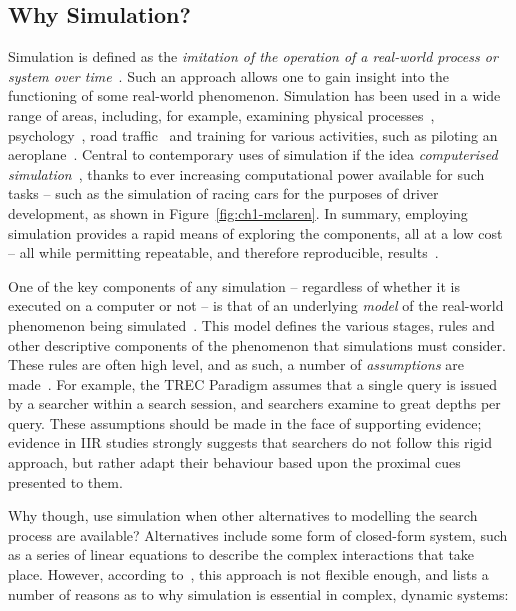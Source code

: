 \subsection{Why Simulation?}\label{sec:intro:simulation}
Simulation is defined as the \emph{imitation of the operation of a real-world process or system over time}~\citep{banks1996discrete}. Such an approach allows one to gain insight into the functioning of some real-world phenomenon. Simulation has been used in a wide range of areas, including, for example, examining physical processes~\citep{haessig1991physics_modelling}, psychology~\citep{hastie1988human_memory_simulation}, road traffic~\citep{mahmud2016traffic_modelling_electric} and training for various activities, such as piloting an aeroplane~\citep{sparko2010flight_simulators}. Central to contemporary uses of simulation if the idea \emph{computerised simulation}~\citep{heermann1990computer_simulation}, thanks to ever increasing computational power available for such tasks -- such as the simulation of racing cars for the purposes of driver development, as shown in Figure~\ref{fig:ch1-mclaren}. In summary, employing simulation provides a rapid means of exploring the components, all at a low cost -- all while permitting repeatable, and therefore reproducible, results~\citep{maxwell2016agents}.

One of the key components of any simulation -- regardless of whether it is executed on a computer or not -- is that of an underlying \emph{model} of the real-world phenomenon being simulated~\citep{tocher1963art_of_simulation}. This model defines the various stages, rules and other descriptive components of the phenomenon that simulations must consider. These rules are often high level, and as such, a number of \emph{assumptions} are made~\citep{tocher1963art_of_simulation}. For example, the TREC Paradigm assumes that a single query is issued by a searcher within a search session, and searchers examine to great depths per query. These assumptions should be made in the face of supporting evidence; evidence in IIR studies strongly suggests that searchers do not follow this rigid approach, but rather adapt their behaviour based upon the proximal cues presented to them.

Why though, use simulation when other alternatives to modelling the search process are available? Alternatives include some form of closed-form system, such as a series of linear equations to describe the complex interactions that take place. However, according to~\citealp{fishwick1995simulation}, this approach is not flexible enough, and lists a number of reasons as to why simulation is essential in complex, dynamic systems:

